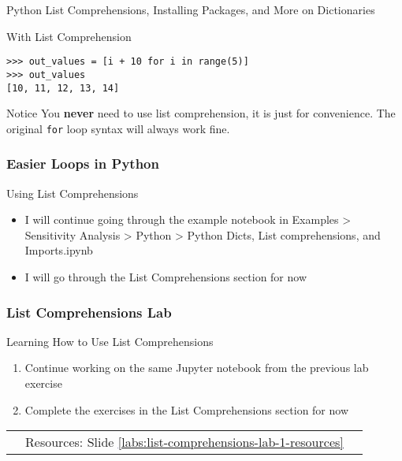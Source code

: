\documentclass[handout, 11pt]{beamer}
\begin{document}
\begin{section}{Python List Comprehensions, Installing Packages, and More on Dictionaries}
\begin{frame}[fragile]
\begin{block}{With List Comprehension}
\begin{verbatim}
>>> out_values = [i + 10 for i in range(5)]
>>> out_values
[10, 11, 12, 13, 14]

\end{verbatim}
\end{block}
\begin{block}{Notice}
You
\textbf{never}
need to use list comprehension, it is just for convenience. The original
\texttt{for}
loop syntax will always work fine.
\end{block}
\end{frame}
\begin{frame}
\frametitle{Easier Loops in Python}
{
\begin{block}{Using List Comprehensions}
\begin{itemize}
\item I will continue going through the example notebook in Examples > Sensitivity Analysis > Python > Python Dicts, List comprehensions, and Imports.ipynb
\item I will go through the List Comprehensions section for now
\end{itemize}
\end{block}
}
\end{frame}
\begin{frame}
\frametitle{List Comprehensions Lab}
{
\begin{block}{Learning How to Use List Comprehensions}
\begin{enumerate}
\item Continue working on the same Jupyter notebook from the previous lab exercise
\item Complete the exercises in the List Comprehensions section for now
\end{enumerate}
\vfill
\begin{tabular*}{\textwidth}{@{\extracolsep{\fill}}ccc}
\toprule
\hfill & Resources: Slide \textcolor{blue}{\underline{\ref{labs:list-comprehensions-lab-1-resources}}} & \hfill\\


\end{tabular*}
\end{block}}
\end{frame}
\end{section}
\end{document}
